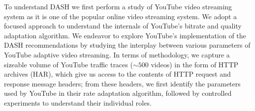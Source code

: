 \label{chap03s1:sec:introduction}



To understand DASH we first perform a study of YouTube video streaming system as it is one of the popular online video streaming system. 
We adopt a focused approach to understand the internals of YouTube's bitrate and quality adaptation algorithm.
We endeavor to explore YouTube's implementation of the DASH recommendations by studying the interplay between various parameters of YouTube adaptive video streaming.
In terms of methodology, we capture a sizeable volume of YouTube traffic traces ($\sim500$ videos) in the form of HTTP archives (HAR), which give us access to the contents of HTTP request and response message headers;
from these headers, we first identify the parameters used by YouTube in their rate adaptation algorithm, followed by controlled experiments to understand their individual roles.

